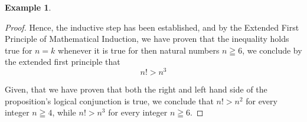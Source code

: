 \documentclass{book}
\theoremstyle{definition}
\newtheorem{example}{Example}[definition]
\theoremstyle{remark}
\begin{document}
\begin{example}
\begin{proof}
            Hence, the inductive step has been established, and by the Extended First Principle of Mathematical Induction, we have proven that the inequality holds true for $n=k$ whenever it is true for then natural numbers $n \geqq 6$, we conclude by the extended first principle that
                \begin{equation*}
                    n! > n^3
                \end{equation*}
    
Given, that we have proven that both the right and left hand side of the proposition's logical conjunction is true, we conclude that $n! > n^2$ for every integer $n \geqq 4$, while $n! > n^3$ for every integer $n \geqq 6$. 
\end{proof}
\end{example}
\end{document}
